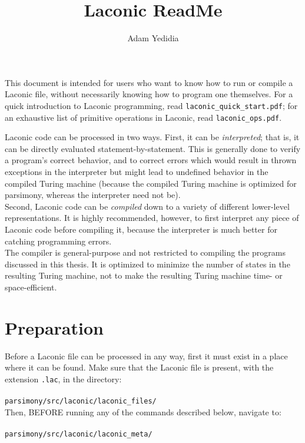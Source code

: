 \documentclass[11pt]{article}
\title{Laconic ReadMe}
\author{Adam Yedidia}
\begin{document}
    
\maketitle

This document is intended for users who want to know how to run or compile a Laconic file, without necessarily knowing how to program one themselves. For a quick introduction to Laconic programming, read \texttt{laconic_quick_start.pdf}; for an exhaustive list of primitive operations in Laconic, read \texttt{laconic_ops.pdf}.

Laconic code can be processed in two ways. First, it can be \emph{interpreted}; that is, it can be directly evaluated statement-by-statement. This is generally done to verify a program's correct behavior, and to correct errors which would result in thrown exceptions in the interpreter but might lead to undefined behavior in the compiled Turing machine (because the compiled Turing machine is optimized for parsimony, whereas the interpreter need not be). \\

Second, Laconic code can be \emph{compiled} down to a variety of different lower-level representations. It is highly recommended, however, to first interpret any piece of Laconic code before compiling it, because the interpreter is much better for catching programming errors. \\

The compiler is general-purpose and not restricted to compiling the programs discussed in this thesis. It is optimized to minimize the number of states in the resulting Turing machine, not to make the resulting Turing machine time- or space-efficient. \\

\section{Preparation}

Before a Laconic file can be processed in any way, first it must exist in a place where it can be found. Make sure that the Laconic file is present, with the extension \texttt{.lac}, in the directory: \\ \\
\texttt{parsimony/src/laconic/laconic_files/} \\ 

Then, BEFORE running any of the commands described below, navigate to: \\ \\
\texttt{parsimony/src/laconic/laconic_meta/}
\end{document}
